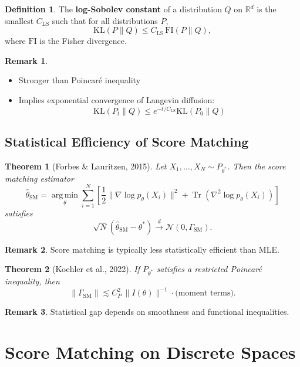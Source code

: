 \documentclass[12pt,oneside]{book}
\numberwithin{equation}{section}
\theoremstyle{definition}
\newtheorem{definition}{Definition}[section]
\newtheorem{remark}{Remark}[section]
\theoremstyle{plain}
\newtheorem{theorem}{Theorem}[section]
\theoremstyle{remark}
\newcommand{\R}{\mathbb{R}}
\newcommand{\convd}{\overset{d}{\to}}
\newcommand{\argmin}{\operatorname*{arg\,min}}
\newcommand{\Normal}{\mathcal{N}}
\begin{document}
\begin{definition}
The \textbf{log-Sobolev constant} of a distribution $Q$ on $\R^d$ is the smallest $C_{\mathrm{LS}}$ such that for all distributions $P$,
\[
\mathrm{KL}(P \| Q) \le C_{\mathrm{LS}} \, \mathrm{FI}(P \| Q),
\]
where $\mathrm{FI}$ is the Fisher divergence.
\end{definition}

\begin{remark}
\begin{itemize}
    \item Stronger than Poincaré inequality
    \item Implies exponential convergence of Langevin diffusion:
    \[
    \mathrm{KL}(P_t \| Q) \le e^{-t / C_{\mathrm{LS}}} \mathrm{KL}(P_0 \| Q)
    \]
\end{itemize}
\end{remark}

\subsection{Statistical Efficiency of Score Matching}

\begin{theorem}[Forbes \& Lauritzen, 2015]
Let $X_1,\dots,X_N \sim P_{\theta^*}$. Then the score matching estimator
\[
\hat{\theta}_{\mathrm{SM}} = \argmin_\theta \sum_{i=1}^N 
\left[
\frac{1}{2}\|\nabla \log p_\theta(X_i)\|^2 + \operatorname{Tr}(\nabla^2 \log p_\theta(X_i))
\right]
\]
satisfies
\[
\sqrt{N}(\hat{\theta}_{\mathrm{SM}} - \theta^*) \convd \Normal(0, \Gamma_{\mathrm{SM}}).
\]
\end{theorem}

\begin{remark}
Score matching is typically less statistically efficient than MLE.
\end{remark}

\begin{theorem}[Koehler et al., 2022]
If $P_{\theta^*}$ satisfies a restricted Poincaré inequality, then
\[
\|\Gamma_{\mathrm{SM}}\| \lesssim C_P^2 \, \|I(\theta)\|^{-1} \cdot \text{(moment terms)}.
\]
\end{theorem}

\begin{remark}
Statistical gap depends on smoothness and functional inequalities.
\end{remark}

\section{Score Matching on Discrete Spaces}
\end{document}
